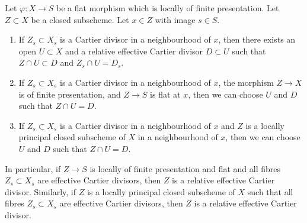 \begin{lemma}
\label{lemma-fibre-Cartier}
Let $\varphi : X \to S$ be a flat morphism which is locally of finite
presentation. Let $Z \subset X$ be a closed subscheme.
Let $x \in Z$ with image $s \in S$.
\begin{enumerate}
\item If $Z_s \subset X_s$ is a Cartier divisor in a neighbourhood of $x$,
then there exists an open $U \subset X$ and a
relative effective Cartier divisor $D \subset U$ such that
$Z \cap U \subset D$ and $Z_s \cap U = D_s$.
\item If $Z_s \subset X_s$ is a Cartier divisor in a neighbourhood of $x$,
the morphism $Z \to X$ is of finite presentation, and $Z \to S$ is flat at
$x$, then we can choose $U$ and $D$ such that $Z \cap U = D$.
\item If $Z_s \subset X_s$ is a Cartier divisor in a neighbourhood of $x$
and $Z$ is a locally principal closed subscheme of $X$ in a neighbourhood
of $x$, then we can choose $U$ and $D$ such that $Z \cap U = D$.
\end{enumerate}
In particular, if $Z \to S$ is locally of finite presentation and flat and
all fibres $Z_s \subset X_s$ are effective Cartier divisors, then
$Z$ is a relative effective Cartier divisor. Similarly, if $Z$
is a locally principal closed subscheme of $X$ such that all fibres
$Z_s \subset X_s$ are effective Cartier divisors, then
$Z$ is a relative effective Cartier divisor.
\end{lemma}

